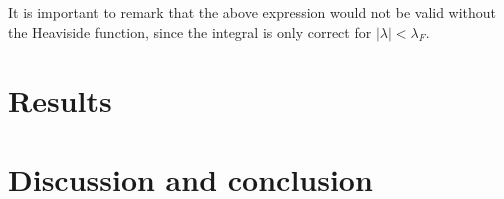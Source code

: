 \documentclass[11pt, a4paper]{report} %
\begin{document}
It is important to remark that the above expression would not be valid without the Heaviside function, since the integral is only correct for \(\lvert\lambda\rvert< \lambda_F\).
\chapter{Results}

\chapter{Discussion and conclusion}




\end{document}
